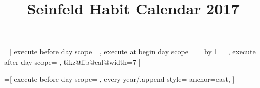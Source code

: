 \documentclass[12pt, landscape]{article}
\title{Seinfeld Habit Calendar 2017}
\begin{document}
\pagestyle{empty}


    =[
        execute before day scope={%
        },
        execute at begin day scope={%
            \pgfmathsetlength\pgf@x{\tikz@lib@cal@xshift}%
            \ifnum{}
            \else
                \c@pgf@counta=\pgfcalendarcurrentweekday
                \advance\c@pgf@counta by 1
            \fi
            \pgf@x=\c@pgf@counta\pgf@x
            \pgftransformxshift{\pgf@x}
        },
        execute after day scope={
        },
        tikz@lib@cal@width=7
    ]

    =[
        execute before day scope={
        },
        every year/.append style={
            anchor=east,
        }
    ]
\end{document}
